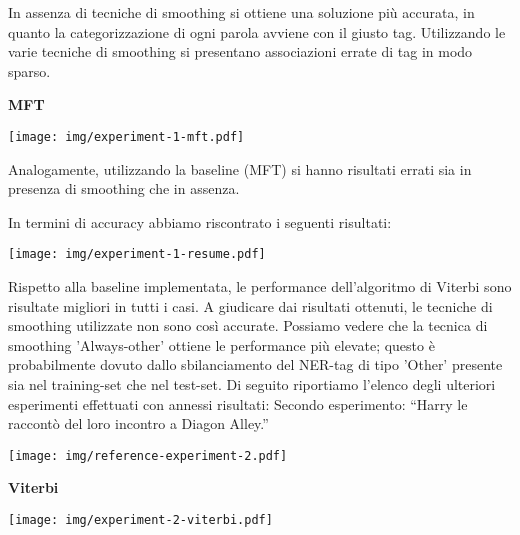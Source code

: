 In assenza di tecniche di smoothing si ottiene una soluzione più accurata, in quanto la categorizzazione di ogni parola avviene con il giusto tag. Utilizzando le varie tecniche di smoothing si presentano associazioni errate di tag in modo sparso.

\newpage

\centerline{\textbf{MFT}}
\begin{outline}
    \begin{center}
     \texttt{[image: img/experiment-1-mft.pdf]}
    \end{center}
\end{outline}
 Analogamente, utilizzando la baseline (MFT) si hanno risultati errati sia in presenza di smoothing che in assenza.
 
 In termini di accuracy abbiamo riscontrato i seguenti risultati:
\begin{outline}
    \begin{center}
     \texttt{[image: img/experiment-1-resume.pdf]}
    \end{center}
\end{outline}
Rispetto alla baseline implementata, le performance dell'algoritmo di Viterbi sono risultate migliori in tutti i casi.
A giudicare dai risultati ottenuti, le tecniche di smoothing utilizzate non sono così accurate. Possiamo vedere che la tecnica di smoothing 'Always-other' ottiene le performance più elevate; questo è probabilmente dovuto dallo sbilanciamento del NER-tag di tipo 'Other' presente sia nel training-set che nel test-set.
\newline
\newline
Di seguito riportiamo l'elenco degli ulteriori esperimenti effettuati con annessi risultati:
\newline
\newline
Secondo esperimento: ``Harry le raccontò del loro incontro a Diagon Alley.''
\begin{outline}
    \begin{center}
     \texttt{[image: img/reference-experiment-2.pdf]}
    \end{center}
\end{outline}
\newline
\newline
\centerline{\textbf{Viterbi}}
\begin{outline}
    \begin{center}
     \texttt{[image: img/experiment-2-viterbi.pdf]}
    \end{center}
\end{outline}
